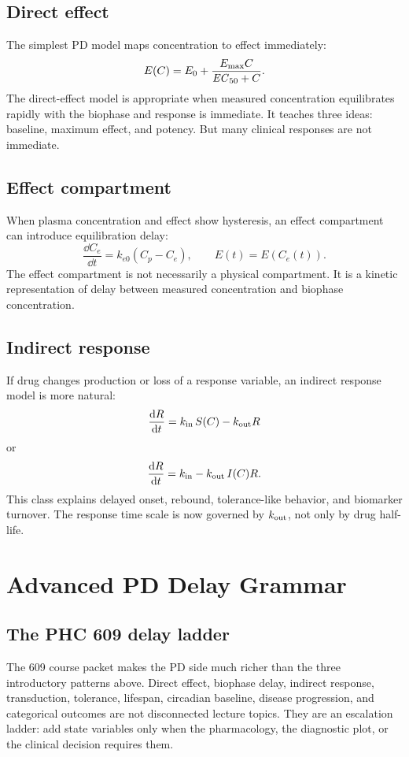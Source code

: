 \documentclass[a4paper]{article}
\newcommand{\pkECfifty}{\pksym{EC}_{50}}
\begin{document}
\subsection{Direct effect}

The simplest PD model maps concentration to effect immediately:
\[
  E(C)=E_0+\frac{\Emax C}{\pkECfifty+C}.
\]
The direct-effect model is appropriate when measured concentration equilibrates rapidly with the biophase and response is immediate. It teaches three ideas: baseline, maximum effect, and potency. But many clinical responses are not immediate.

\subsection{Effect compartment}

When plasma concentration and effect show hysteresis, an effect compartment can introduce equilibration delay:
\[
  \frac{\dd C_e}{\dd t}=k_{e0}(C_p-C_e),
  \qquad
  E(t)=E(C_e(t)).
\]
The effect compartment is not necessarily a physical compartment. It is a kinetic representation of delay between measured concentration and biophase concentration.

\subsection{Indirect response}

If drug changes production or loss of a response variable, an indirect response model is more natural:
\[
  \frac{\mathop{}\!\mathrm{d} R}{\mathop{}\!\mathrm{d} t}
  =
  k_{\mathrm{in}}\,S(C)
  -
  k_{\mathrm{out}}R
\]
or
\[
  \frac{\mathop{}\!\mathrm{d} R}{\mathop{}\!\mathrm{d} t}
  =
  k_{\mathrm{in}}
  -
  k_{\mathrm{out}}\,I(C)R.
\]
This class explains delayed onset, rebound, tolerance-like behavior, and biomarker turnover. The response time scale is now governed by \(k_{\mathrm{out}}\), not only by drug half-life.

\figurePDDelays

\section{Advanced PD Delay Grammar}

\subsection{The PHC 609 delay ladder}

The 609 course packet makes the PD side much richer than the three introductory patterns above. Direct effect, biophase delay, indirect response, transduction, tolerance, lifespan, circadian baseline, disease progression, and categorical outcomes are not disconnected lecture topics. They are an escalation ladder: add state variables only when the pharmacology, the diagnostic plot, or the clinical decision requires them.
\end{document}
